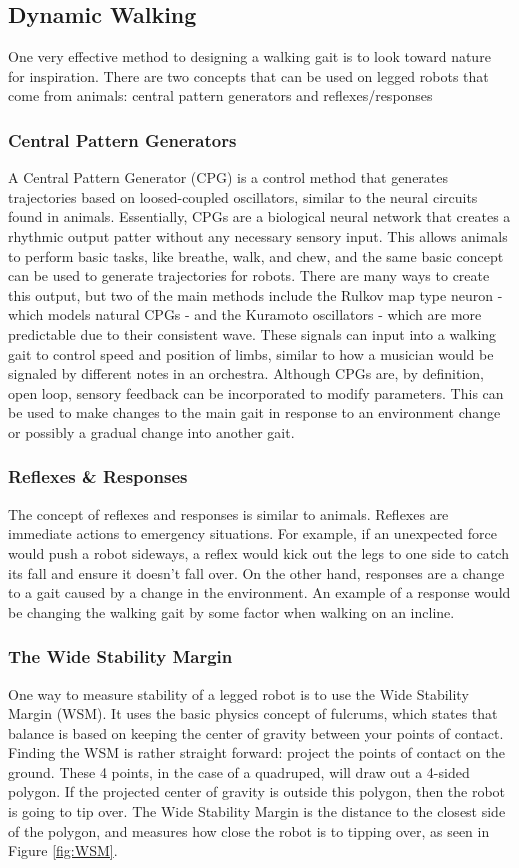 \subsection{Dynamic Walking}
One very effective method to designing a walking gait is to look toward nature for inspiration. There are two concepts that can be used on legged robots that come from animals: central pattern generators and reflexes/responses
\subsubsection*{Central Pattern Generators}
A Central Pattern Generator (CPG) is a control method that generates trajectories based on loosed-coupled oscillators, similar to the neural circuits found in animals. Essentially, CPGs are a biological neural network that creates a rhythmic output patter without any necessary sensory input. This allows animals to perform basic tasks, like breathe, walk, and chew, and the same basic concept can be used to generate trajectories for robots. There are many ways to create this output, but two of the main methods include the Rulkov map type neuron - which models natural CPGs - and the Kuramoto oscillators - which are more predictable due to their consistent wave. These signals can input into a walking gait to control speed and position of limbs, similar to how a musician would be signaled by different notes in an orchestra. Although CPGs are, by definition, open loop, sensory feedback can be incorporated to modify parameters. This can be used to make changes to the main gait in response to an environment change or possibly a gradual change into another gait.

\subsubsection*{Reflexes \& Responses}
The concept of reflexes and responses is similar to animals. Reflexes are immediate actions to emergency situations. For example, if an unexpected force would push a robot sideways, a reflex would kick out the legs to one side to catch its fall and ensure it doesn't fall over. On the other hand, responses are a change to a gait caused by a change in the environment. An example of a response would be changing the walking gait by some factor when walking on an incline.

\subsubsection*{The Wide Stability Margin}
One way to measure stability of a legged robot is to use the Wide Stability Margin (WSM). It uses the basic physics concept of fulcrums, which states that balance is based on keeping the center of gravity between your points of contact. Finding the WSM is rather straight forward: project the points of contact on the ground. These 4 points, in the case of a quadruped, will draw out a 4-sided polygon. If the projected center of gravity is outside this polygon, then the robot is going to tip over. The Wide Stability Margin is the distance to the closest side of the polygon, and measures how close the robot is to tipping over, as seen in Figure \ref{fig:WSM}. \cite{kimura2007adaptive}

